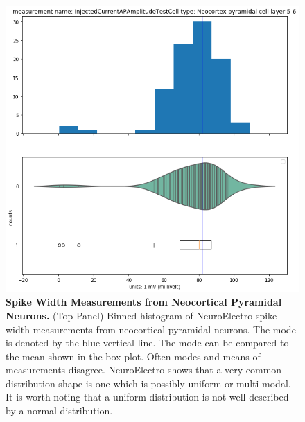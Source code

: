 \begin{figure}
\begin{center}
\includegraphics[width=0.7\linewidth]{chapters/notebooks_converted/needata_thesis_files/needata_thesis_5_16}
\caption[Spike Width Measurements from Neocortical Pyramidal Neurons]{\textbf{Spike Width Measurements from Neocortical Pyramidal Neurons.} (Top Panel) Binned histogram of NeuroElectro spike width measurements from neocortical pyramidal neurons.
The mode is denoted by the blue vertical line. The mode can be compared to the mean shown in the box plot. Often modes and means of measurements disagree.  NeuroElectro shows that a very common distribution shape is one which is possibly uniform or multi-modal. It is worth noting that a uniform distribution is not well-described by a normal distribution.}
\label{fig:uniform-feature}
\end{center}
\end{figure}


